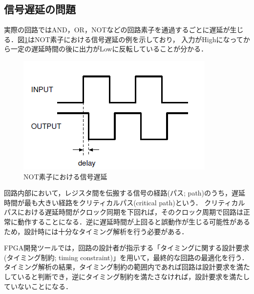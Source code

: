 \documentclass{jlreq}
\numberwithin{equation}{section}
\begin{document}
\subsection{信号遅延の問題}
実際の回路ではAND，OR，NOTなどの回路素子を通過するごとに遅延が生じる．図\ref{fig:logic_delay}はNOT素子における信号遅延の例を示しており，
入力がHighになってから一定の遅延時間の後に出力がLowに反転していることが分かる．
\begin{figure}[H]
  \centering
  \includegraphics{assets/logic_delay.png}
  \caption{NOT素子における信号遅延}
  \label{fig:logic_delay}
\end{figure}
回路内部において，レジスタ間を伝搬する信号の経路(パス; path)のうち，遅延時間が最も大きい経路をクリティカルパス(critical path)という．
クリティカルパスにおける遅延時間がクロック同期を下回れば，そのクロック周期で回路は正常に動作することになる．逆に遅延時間が上回ると誤動作が生じる可能性があるため，設計時には十分なタイミング解析を行う必要がある．

FPGA開発ツールでは，回路の設計者が指示する「タイミングに関する設計要求(タイミング制約; timing constraint)」を用いて，最終的な回路の最適化を行う．
タイミング解析の結果，タイミング制約の範囲内であれば回路は設計要求を満たしていると判断でき，逆にタイミング制約を満たさなければ，設計要求を満たしていないことになる．
\end{document}
